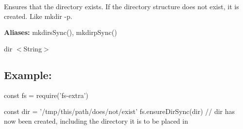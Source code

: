 Ensures that the directory exists. If the directory structure does not exist, it is created. Like {\ttfamily mkdir -\/p}.

{\bfseries Aliases\+:} {\ttfamily mkdirs\+Sync()}, {\ttfamily mkdirp\+Sync()}


\begin{DoxyItemize}
\item {\ttfamily dir} {\ttfamily $<$String$>$}
\end{DoxyItemize}

\subsection*{Example\+:}


\begin{DoxyCode}
const fs = require('fs-extra')

const dir = '/tmp/this/path/does/not/exist'
fs.ensureDirSync(dir)
// dir has now been created, including the directory it is to be placed in
\end{DoxyCode}
 
